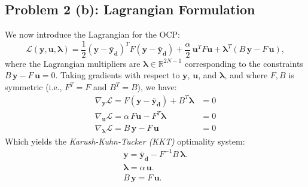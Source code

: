 \subsection*{Problem 2 (b): Lagrangian Formulation}

We now introduce the Lagrangian for the OCP:
\[
	\mathcal{L}(\mathbf{y},\mathbf{u},\symbf{\lambda}) = \frac{1}{2}(\mathbf{y}-\mathbf{\bar{y}_d})^T F (\mathbf{y}-\mathbf{\bar{y}_d}) + \frac{\alpha}{2}\, \mathbf{u}^T F \mathbf{u} + \symbf{\lambda}^T (B\,\mathbf{y} - F\,\mathbf{u}),
\]
where the Lagrangian multipliers are \(\symbf{\lambda} \in \mathbb{R}^{2N-1}\) corresponding to the constraints \(B\,\mathbf{y} - F\,\mathbf{u} = 0\).
Taking gradients with respect to \(\mathbf{y}\), \(\mathbf{u}\), and \(\symbf{\lambda}\), and where \(F, B\) is symmetric (i.e., \(F^T = F\) and \(B^T = B\)), we have:
\begin{align*}
	\nabla_{\mathbf{y}}\mathcal{L} = F(\mathbf{y}-\mathbf{\bar{y}_d}) + B^T\symbf{\lambda} & = 0 \\
	\nabla_{\mathbf{u}}\mathcal{L} = \alpha\,F\mathbf{u} - F^T\symbf{\lambda}      & = 0 \\
	\nabla_{\symbf{\lambda}}\mathcal{L} = B\,\mathbf{y} - F\,\mathbf{u}            & = 0
\end{align*}
Which yields the \emph{Karush-Kuhn-Tucker (KKT)} optimality system:
\begin{align*}
	\mathbf{y} = \mathbf{\bar{y}_d} - F^{-1}B\,\symbf{\lambda}. \tag{1} \label{eq:grad_y} \\
	\symbf{\lambda} = \alpha\,\mathbf{u}. \tag{2} \label{eq:grad_u}               \\
	B\,\mathbf{y} = F\,\mathbf{u}. \tag{3} \label{eq:grad_lambda}
\end{align*}

